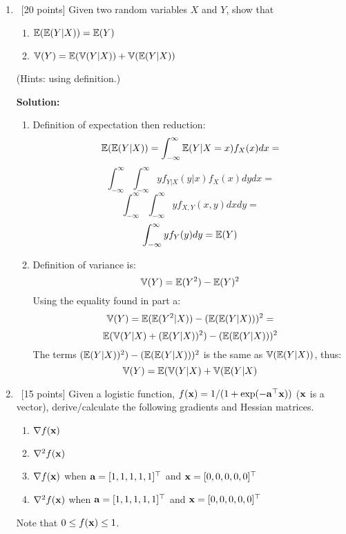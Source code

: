 \documentclass[12pt, fullpage,letterpaper]{article}
\begin{document}
\begin{enumerate}
\item~[20 points]  Given two random variables $X$ and $Y$, show that 
\begin{enumerate}
\item $\mathbb{E}(\mathbb{E}(Y|X)) = \mathbb{E}(Y)$
\item
$\mathbb{V}(Y) = \mathbb{E}(\mathbb{V}(Y|X)) + \mathbb{V}(\mathbb{E}(Y|X))$
\end{enumerate}
(Hints: using definition.)

\textbf{Solution:}
\begin{enumerate}
	\item Definition of expectation then reduction:
		$$\mathbb{E}(\mathbb{E}(Y | X)) = \int_{-\infty}^{\infty} \mathbb{E}(Y | X = x)f_X(x) dx =$$
	 	$$\int_{-\infty}^{\infty} \int_{-\infty}^{\infty} yf_{Y|X}(y|x)f_X(x) dy dx =$$
	 	$$\int_{-\infty}^{\infty} \int_{-\infty}^{\infty} yf_{X,Y}(x,y) dx dy =$$
	 	$$\int_{-\infty}^{\infty} yf_Y(y) dy = \mathbb{E}(Y)$$
	\item Definition of variance is:
		$$\mathbb{V}(Y) = \mathbb{E}(Y^2) - \mathbb{E}(Y)^2 \\$$
		Using the equality found in part a: \\
		$$\mathbb{V}(Y) = \mathbb{E}(\mathbb{E}(Y^2 | X)) - (\mathbb{E}(\mathbb{E}(Y | X)))^2 =$$
		$$\mathbb{E}(\mathbb{V}(Y | X) + (\mathbb{E}(Y | X))^2) - (\mathbb{E}(\mathbb{E}(Y | X)))^2$$
		The terms $(\mathbb{E}(Y | X))^2) - (\mathbb{E}(\mathbb{E}(Y | X)))^2$ is the same as $\mathbb{V}(\mathbb{E}(Y | X))$, thus: \\
		$$\mathbb{V}(Y) = \mathbb{E}(\mathbb{V}(Y | X) + \mathbb{V}(\mathbb{E}(Y | X)$$
		
		
\end{enumerate}


\item~[15 points] Given a logistic function, $f({\bf x}) = 1/(1+\exp(-{\bf a}^\top {\bf x}))$ (${\bf x}$ is a vector), derive/calculate the following gradients and Hessian matrices.  
\begin{enumerate}
\item $\nabla f({\bf x})$
\item $\nabla^2 f({\bf x})$
\item $\nabla f({\bf x})$ when ${\bf a} = [1,1,1,1,1]^\top$ and ${\bf x} = [0,0,0,0,0]^\top$
\item $\nabla^2 f({\bf x})$  when ${\bf a} = [1,1,1,1,1]^\top$ and ${\bf x} = [0,0,0,0,0]^\top$
\end{enumerate}
Note that $0 \le f({\bf x}) \le 1$.


\end{enumerate}
\end{document}
